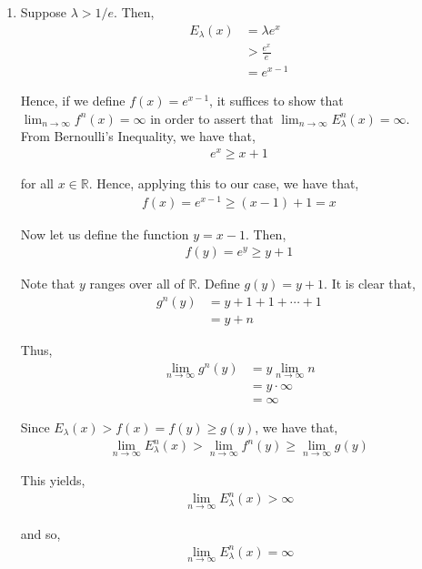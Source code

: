 \documentclass[12pt]{article}
\begin{document}
\begin{enumerate}[label=(\alph*)]

\item Suppose $\lambda > 1/e$. Then,
\begin{align*}
E_{\lambda}(x) &= \lambda e^x\\
&> \frac{e^x}{e}\\
&= e^{x-1}
\end{align*}

Hence, if we define $f(x) = e^{x-1}$, it suffices to show that $\lim_{n \to \infty} f^n(x) = \infty$ in order to assert that $\lim_{n \to \infty} E_{\lambda}^n(x) = \infty$.\\

From Bernoulli's Inequality, we have that,
\begin{align*}
e^x \geq x+1
\end{align*}

for all $x \in \mathbb{R}$. Hence, applying this to our case, we have that,
\begin{align*}
f(x) = e^{x-1} \geq (x-1)+1 = x
\end{align*}

Now let us define the function $y = x-1$. Then,
\begin{align*}
f(y) = e^{y} \geq y + 1
\end{align*}

Note that $y$ ranges over all of $\mathbb{R}$. Define $g(y) = y+1$. It is clear that,
\begin{align*}
g^n(y) &= y + 1 + 1 + \cdots + 1\\
&= y + n
\end{align*}

Thus,
\begin{align*}
\lim_{n \to \infty} g^n(y) &= y \lim_{n \to \infty} n\\
&= y \cdot \infty\\
&= \infty
\end{align*}

Since $E_{\lambda}(x) > f(x) = f(y) \geq g(y)$, we have that,
\begin{align*}
\lim_{n \to \infty} E_{\lambda}^n(x) > \lim_{n \to \infty} f^n(y) \geq \lim_{n \to \infty} g(y)
\end{align*}

This yields,
\begin{align*}
\lim_{n \to \infty} E_{\lambda}^n(x) > \infty
\end{align*}

and so,
\begin{align*}
\lim_{n \to \infty} E_{\lambda}^n(x) = \infty
\end{align*}


\end{enumerate}
\end{document}
